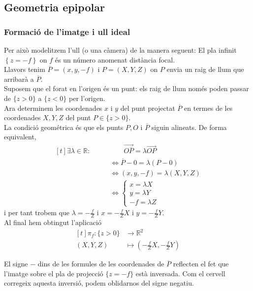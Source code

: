\documentclass[../main.tex]{subfiles}
\begin{document}
	\subsection{Geometria epipolar}
	\subsubsection{Formació de l'imatge i ull ideal}
	Per això modelitzem l'ull (o una càmera) de la manera seguent:
	El pla infinit $\left\{z = -f\right\}$ on $f$ és un número anomenat distància focal.\\
	Llavors tenim $\overline{P} = \left(x,y,-f\right)$ i $P = \left(X, Y, Z\right)$ on $P$ envia un raig de llum que arribarà a $\overline{P}$.\\
	Suposem que el forat en l'origen és un punt: els raig de llum només poden passar de $\{z > 0\}$ a $\{z < 0\}$ per l'origen.\\
	Ara determinem les coordenades $x$ i $y$ del punt projectat $\overline{P}$ en termes de les coordenades $X, Y, Z$ del punt $P \in \{z > 0\}$.\\
	La condició geométrica és que els punts $P, O$ i $\overline{P}$ siguin alineats. De forma equivalent,
	\begin{displaymath}
		\begin{aligned}[t]
			\exists \lambda \in \mathbb{R} : \qquad&\qquad \overrightarrow{O\overline{P}} = \lambda \overrightarrow{OP}\\
			&\iff \overline{P}-0 = \lambda(P - 0)\\
			&\iff (x, y, -f) = \lambda(X, Y, Z)\\
			&\iff \begin{cases}
				x = \lambda X\\
				y = \lambda Y\\
				-f = \lambda Z
			\end{cases}
		\end{aligned}
	\end{displaymath}
	i per tant trobem que $\lambda = -\frac{f}{Z}$ i $x = -\frac{f}{Z}X$ i $y = -\frac{f}{Z}Y$.\\
	Al final hem obtingut l'aplicació
	\begin{displaymath}
		\begin{aligned}[t]
			\pi_f: \{z>0\} &\to \mathbb{R}^2\\
			(X, Y, Z) &\mapsto \left(-\frac{f}{Z}X, -\frac{f}{Z}Y\right)
		\end{aligned}
	\end{displaymath}
	\begin{obs}
		El signe $-$ dins de les formules de les coordenades de $\overline{P}$ reflecten el fet que l'imatge sobre el pla de projecció $\{z = -f\}$ està inversada.
		Com el cervell corregeix aquesta inversió, podem oblidarnos del signe negatiu.
	\end{obs}
\end{document}
